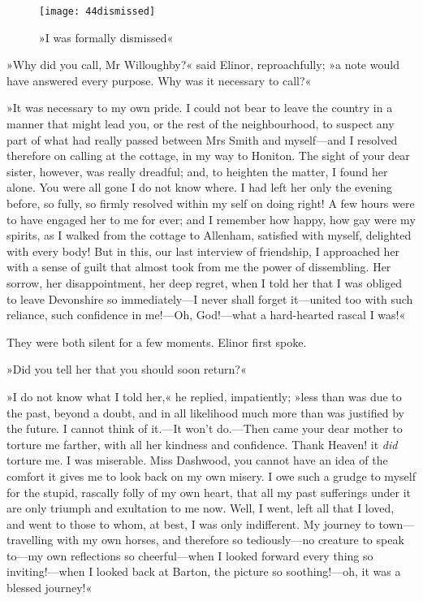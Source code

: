 \begin{figure}[tbph]
\centering
\texttt{[image: 44dismissed]}
\caption{»I was formally dismissed«}
\end{figure}

»Why did you call, Mr Willoughby?« said Elinor, reproachfully; »a note would have answered every purpose. Why was it necessary to call?«

»It was necessary to my own pride. I could not bear to leave the country in a manner that might lead you, or the rest of the neighbourhood, to suspect any part of what had really passed between Mrs Smith and myself—and I resolved therefore on calling at the cottage, in my way to Honiton. The sight of your dear sister, however, was really dreadful; and, to heighten the matter, I found her alone. You were all gone I do not know where. I had left her only the evening before, so fully, so firmly resolved within my self on doing right! A few hours were to have engaged her to me for ever; and I remember how happy, how gay were my spirits, as I walked from the cottage to Allenham, satisfied with myself, delighted with every body! But in this, our last interview of friendship, I approached her with a sense of guilt that almost took from me the power of dissembling. Her sorrow, her disappointment, her deep regret, when I told her that I was obliged to leave Devonshire so immediately—I never shall forget it—united too with such reliance, such confidence in me!—Oh, God!—what a hard-hearted rascal I was!«

They were both silent for a few moments. Elinor first spoke.

»Did you tell her that you should soon return?«

»I do not know what I told her,« he replied, impatiently; »less than was due to the past, beyond a doubt, and in all likelihood much more than was justified by the future. I cannot think of it.—It won’t do.—Then came your dear mother to torture me farther, with all her kindness and confidence. Thank Heaven! it \textit{did} torture me. I was miserable. Miss Dashwood, you cannot have an idea of the comfort it gives me to look back on my own misery. I owe such a grudge to myself for the stupid, rascally folly of my own heart, that all my past sufferings under it are only triumph and exultation to me now. Well, I went, left all that I loved, and went to those to whom, at best, I was only indifferent. My journey to town—travelling with my own horses, and therefore so tediously—no creature to speak to—my own reflections so cheerful—when I looked forward every thing so inviting!—when I looked back at Barton, the picture so soothing!—oh, it was a blessed journey!«

